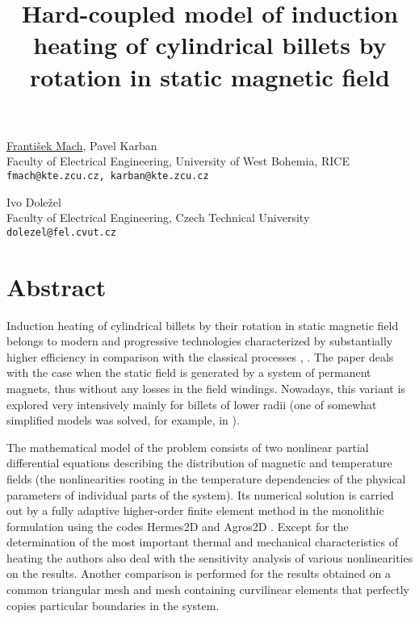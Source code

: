 \title{Hard-coupled model of induction heating of cylindrical billets by rotation in static magnetic field}
\author{} \institute{}
\maketitle

\begin{center}
{\large \underline{Franti\v{s}ek Mach}, Pavel Karban}\\
Faculty of Electrical Engineering, University of West Bohemia, RICE\\
{\tt fmach@kte.zcu.cz, karban@kte.zcu.cz}\\
\vspace{4mm}

{\large Ivo Dole\v{z}el}\\
Faculty of Electrical Engineering, Czech Technical University\\
{\tt dolezel@fel.cvut.cz}
\end{center}

\section*{Abstract}
Induction heating of cylindrical billets by their rotation in static magnetic field belongs to modern and progressive technologies characterized by substantially higher efficiency in comparison with the classical processes \cite{UIE1}, \cite{UIE2}. The paper deals with the case when the static field is generated by a system of permanent magnets, thus without any losses in the field windings. Nowadays, this variant is explored very intensively mainly for billets of lower radii (one of somewhat simplified models was solved, for example, in \cite{HES}).

The mathematical model of the problem consists of two nonlinear partial differential equations describing the distribution of magnetic and temperature fields (the nonlinearities rooting in the temperature dependencies of the physical parameters of individual parts of the system). Its numerical solution is carried out by a fully adaptive higher-order finite element method in the monolithic formulation using the codes Hermes2D and Agros2D \cite{Hermes2D}. Except for the determination of the most important thermal and mechanical characteristics of heating the authors also deal with the sensitivity analysis of various nonlinearities on the results. Another comparison is performed for the results obtained on a common triangular mesh and mesh containing curvilinear elements that perfectly copies particular boundaries in the system.

